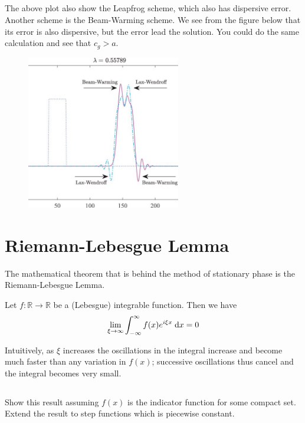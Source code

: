 \documentclass[11pt,letterpaper]{report}
\begin{document}
\subsection{}
The above plot also show the Leapfrog scheme, which also has dispersive error. Another scheme is the Beam-Warming scheme. We see from the figure below that its error is also dispersive, but the error lead the solution. You could do the same calculation and see that $c_g>a$. 
\begin{figure}[H]
    \centering
    \includegraphics[width=0.6\textwidth]{../Session_9/figs/beamwarming}
\end{figure}


\section{Riemann-Lebesgue Lemma}
The mathematical theorem that is behind the method of stationary phase is the Riemann-Lebesgue Lemma. 
\begin{displayquote}
    Let $f:\mathbb{R}\to\mathbb{R}$ be a (Lebesgue) integrable function. Then we have
    \begin{align}
        \lim_{\xi\to\infty} \int^\infty_{-\infty} f(x)e^{i\xi x}\;\mathrm{d} x = 0
    \end{align}
\end{displayquote}
Intuitively, as $\xi$ increases the oscillations in the integral increase and become much faster than any variation in $f(x)$; successive oscillations thus cancel and the integral becomes very small.

\subsection{}
Show this result assuming $f(x)$ is the indicator function for some compact set. Extend the result to step functions which is piecewise constant. 
\end{document}
